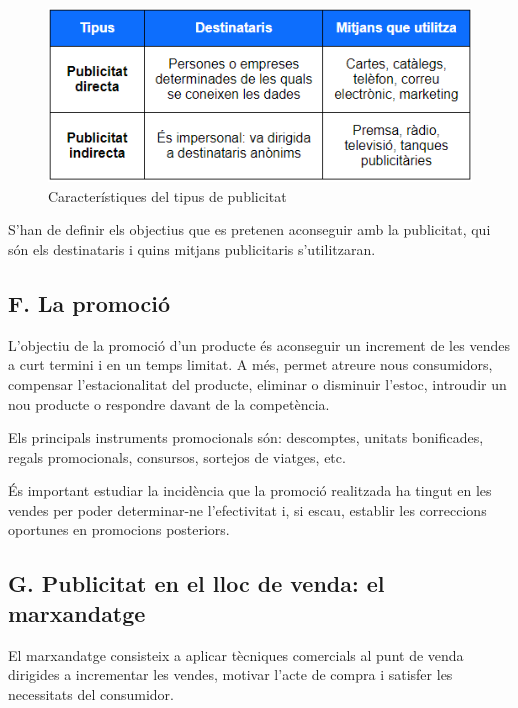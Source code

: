\documentclass[
]{book}
\begin{document}
\begin{figure}
\centering
\includegraphics{tablaPublicitat.png}
\caption{\label{fig:unnamed-chunk-2}Característiques del tipus de publicitat}
\end{figure}

S'han de definir els objectius que es pretenen aconseguir amb la publicitat, qui són els destinataris i quins mitjans publicitaris s'utilitzaran.

\hypertarget{f.-la-promociuxf3}{%
\subsection*{F. La promoció}\label{f.-la-promociuxf3}}

L'objectiu de la promoció d'un producte és aconseguir un increment de les vendes a curt termini i en un temps limitat. A més, permet atreure nous consumidors, compensar l'estacionalitat del producte, eliminar o disminuir l'estoc, introudir un nou producte o respondre davant de la competència.

Els principals instruments promocionals són: descomptes, unitats bonificades, regals promocionals, consursos, sortejos de viatges, etc.

És important estudiar la incidència que la promoció realitzada ha tingut en les vendes per poder determinar-ne l'efectivitat i, si escau, establir les correccions oportunes en promocions posteriors.

\hypertarget{g.-publicitat-en-el-lloc-de-venda-el-marxandatge}{%
\subsection*{G. Publicitat en el lloc de venda: el marxandatge}\label{g.-publicitat-en-el-lloc-de-venda-el-marxandatge}}

El marxandatge consisteix a aplicar tècniques comercials al punt de venda dirigides a incrementar les vendes, motivar l'acte de compra i satisfer les necessitats del consumidor.
\end{document}
